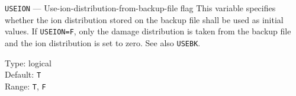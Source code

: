 \begin{keydescription}{\texttt{USEION} --- Use-ion-distribution-from-backup-file
                       flag}
%
  This variable specifies whether the ion distribution stored on the
  backup file shall be used as initial values. If \texttt{USEION=F}, only
  the damage distribution is taken from the backup file and the ion
  distribution is set to zero. See also \texttt{USEBK}.
%
  \begin{keytab}
    Type:    \> logical \\
    Default: \> \texttt{T} \\
    Range:   \> \texttt{T}, \texttt{F}
  \end{keytab}
\end{keydescription}

